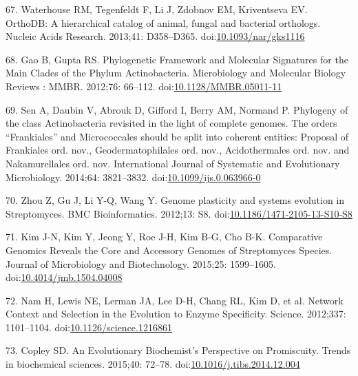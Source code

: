 \documentclass[12pt,twoside]{reedthesis}
\begin{document}
  \hypertarget{ref-waterhouseux5forthodbux5f2013}{}
  67. Waterhouse RM, Tegenfeldt F, Li J, Zdobnov EM, Kriventseva EV.
  OrthoDB: A hierarchical catalog of animal, fungal and bacterial
  orthologs. Nucleic Acids Research. 2013;41: D358--D365.
  doi:\href{https://doi.org/10.1093/nar/gks1116}{10.1093/nar/gks1116}
  
  \hypertarget{ref-gaoux5fphylogeneticux5f2012}{}
  68. Gao B, Gupta RS. Phylogenetic Framework and Molecular Signatures for
  the Main Clades of the Phylum Actinobacteria. Microbiology and Molecular
  Biology Reviews : MMBR. 2012;76: 66--112.
  doi:\href{https://doi.org/10.1128/MMBR.05011-11}{10.1128/MMBR.05011-11}
  
  \hypertarget{ref-senux5fphylogenyux5f2014}{}
  69. Sen A, Daubin V, Abrouk D, Gifford I, Berry AM, Normand P. Phylogeny
  of the class Actinobacteria revisited in the light of complete genomes.
  The orders ``Frankiales'' and Micrococcales should be split into
  coherent entities: Proposal of Frankiales ord. nov., Geodermatophilales
  ord. nov., Acidothermales ord. nov. and Nakamurellales ord. nov.
  International Journal of Systematic and Evolutionary Microbiology.
  2014;64: 3821--3832.
  doi:\href{https://doi.org/10.1099/ijs.0.063966-0}{10.1099/ijs.0.063966-0}
  
  \hypertarget{ref-zhouux5fgenomeux5f2012}{}
  70. Zhou Z, Gu J, Li Y-Q, Wang Y. Genome plasticity and systems
  evolution in Streptomyces. BMC Bioinformatics. 2012;13: S8.
  doi:\href{https://doi.org/10.1186/1471-2105-13-S10-S8}{10.1186/1471-2105-13-S10-S8}
  
  \hypertarget{ref-kimux5fcomparativeux5f2015}{}
  71. Kim J-N, Kim Y, Jeong Y, Roe J-H, Kim B-G, Cho B-K. Comparative
  Genomics Reveals the Core and Accessory Genomes of Streptomyces Species.
  Journal of Microbiology and Biotechnology. 2015;25: 1599--1605.
  doi:\href{https://doi.org/10.4014/jmb.1504.04008}{10.4014/jmb.1504.04008}
  
  \hypertarget{ref-namux5fnetworkux5f2012}{}
  72. Nam H, Lewis NE, Lerman JA, Lee D-H, Chang RL, Kim D, et al. Network
  Context and Selection in the Evolution to Enzyme Specificity. Science.
  2012;337: 1101--1104.
  doi:\href{https://doi.org/10.1126/science.1216861}{10.1126/science.1216861}
  
  \hypertarget{ref-copleyux5fevolutionaryux5f2015}{}
  73. Copley SD. An Evolutionary Biochemist's Perspective on Promiscuity.
  Trends in biochemical sciences. 2015;40: 72--78.
  doi:\href{https://doi.org/10.1016/j.tibs.2014.12.004}{10.1016/j.tibs.2014.12.004}
  
\end{document}
